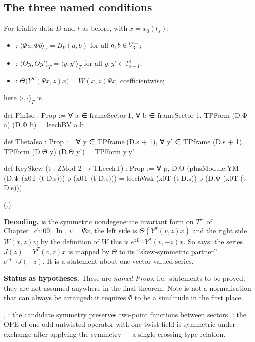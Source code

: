 \subsection{The three named conditions}

\begin{definition}\label{ch14:def:iso}
For triality data $D$ and $t$ as before, with $x=x_0(t_s)$:
\begin{itemize}
\item {}: $\langle\Phi a,\Phi b\rangle_T=B_V(a,b)$ for all $a,b\in V_3^{+}$;
\item {}: $\langle\Theta y,\Theta y'\rangle_T=\langle y,y'\rangle_T$ for all $y,y'\in T_{s+1}^+$;
\item {}: $\Theta\bigl(Y^T(\Psi x,z)x\bigr)=W(x,z)\Psi x$, coefficientwise;
\end{itemize}
here $\langle\cdot,\cdot\rangle_T$ is .
\end{definition}
\begin{leancode}
def PhiIso : Prop :=
  ∀ a ∈ frameSector 1, ∀ b ∈ frameSector 1, TPForm (D.Φ a) (D.Φ b) = leechBV a b

def ThetaIso : Prop :=
  ∀ y ∈ TPframe (D.s + 1), ∀ y' ∈ TPframe (D.s + 1), TPForm (D.Θ y) (D.Θ y') = TPForm y y'

def KeySkew (t : ZMod 2 → TLeechT) : Prop :=
  ∀ p, D.Θ (plusModule.YM (D.Ψ (x0T (t D.s))) p (x0T (t D.s)))
    = leechWsk (x0T (t D.s)) p (D.Ψ (x0T (t D.s)))
\end{leancode}
(.)

\begin{dictionary}
\textbf{Decoding.}   is the symmetric nondegenerate invariant form on $T^+$ of
Chapter~\ref{ch:09}.  In , $v=\Psi x$, the left side is $\Theta(Y^T(v,z)x)$ and the right
side $W(x,z)v$; by the definition of $W$ this is $e^{zL_{-1}}Y^T(v,-z)x$.  So  says: the
series $J(z)=Y^T(v,z)x$ is mapped by $\Theta$ to its ``skew-symmetric partner''
$e^{zL_{-1}}J(-z)$.  It is a statement about one vector-valued series.

\textbf{Status as hypotheses.}  These are \emph{named Props}, i.e.\ statements to be proved; they are
not assumed anywhere in the final theorem.  Note  is not a normalisation that can always be
arranged: it requires $\Phi$ to be a similitude in the first place.
\end{dictionary}
\begin{physics}
, : the candidate symmetry preserves two-point functions between sectors. : the OPE of one odd untwisted operator with one twist field is symmetric under exchange after applying the symmetry — a single crossing-type relation.
\end{physics}


